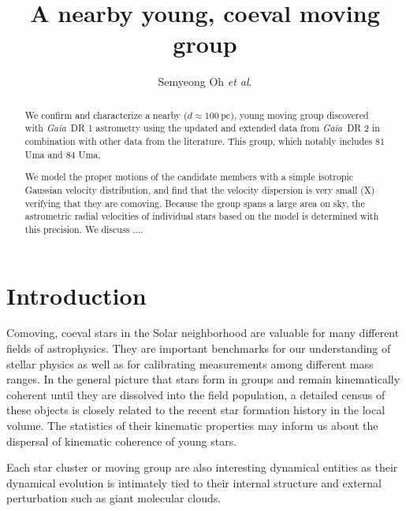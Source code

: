 \documentclass[modern,letterpaper]{aastex61}
\newcommand{\project}[1]{\textsl{#1}}
\newcommand{\gaia}{\project{Gaia}}
\newcommand{\etal}{\textit{et al}.}
\newcommand{\todo}[1]{{\color{crimson}#1}}
\newcommand{\groupDistanceEstimate}{\ensuremath{100~\mathrm{pc}}}
\begin{document}
\sloppy\sloppypar\raggedbottom\frenchspacing %

\title{
  A nearby young, coeval moving group
}

\author[0000-0001-7790-5308]{Semyeong Oh \etal}


\begin{abstract}

  We confirm and characterize a nearby (\todo{$d \approx \groupDistanceEstimate$}),
  young moving group discovered
  with \gaia\ DR 1 astrometry using the updated and extended data from \gaia\ DR 2
  in combination with other data from the literature.
  This group, which notably includes 81 Uma and 84 Uma,

  We model the proper motions of the candidate members with a simple
  isotropic Gaussian velocity distribution, and find that
  the velocity dispersion is very small (\todo{X}) verifying
  that they are comoving.
  Because the group spans a large area on sky, the astrometric radial velocities
  of individual stars based on the model is determined with \todo{this precision}.
  We discuss ....

\end{abstract}

\section{Introduction} %
\label{sec:introduction}

Comoving, coeval stars in the Solar neighborhood are valuable for
many different fields of astrophysics.
They are important benchmarks for our understanding of stellar physics
as well as for calibrating measurements among different mass ranges.
In the general picture that stars form in groups and remain
kinematically coherent until they are dissolved into the field population,
a detailed census of these objects is closely related to the recent star formation history
in the local volume.
The statistics of their kinematic properties may inform us about the dispersal
of kinematic coherence of young stars.

Each star cluster or moving group are also interesting dynamical entities
as their dynamical evolution is intimately tied to their internal structure and
external perturbation such as giant molecular clouds.
\end{document}
